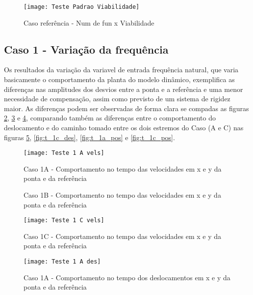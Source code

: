 \begin{figure}[H]
    \begin{center}
    \caption{Caso referência - Num de fun x Viabilidade}
    \texttt{[image: Teste Padrao Viabilidade]}
    \label{fig:t_padr_viab}
    \end{center}
\end{figure}

\subsection{Caso 1 - Variação da frequência}
Os resultados da variação da variavel de entrada frequência natural, que varia basicamente o comportamento da planta do
modelo dinâmico, exemplifica as diferenças nas amplitudes dos desvios entre a ponta e a referência e uma menor necessidade de compensação, assim como previsto
de um sistema de rigidez maior.
As diferenças podem ser observadas de forma clara se compadas as figuras \ref{fig:t_1a_vels}, \ref{fig:t_1b_vels} e \ref{fig:t_1c_vels},
comparando também as diferenças entre o comportamento do deslocamento e do caminho tomado entre os dois estremos do Caso (A e C) nas figuras
\ref{fig:t_1a_des}, \ref{fig:t_1c_des}, \ref{fig:t_1a_pos} e \ref{fig:t_1c_pos}.

\begin{figure}[H]
    \begin{center}
    \caption{Caso 1A - Comportamento no tempo das velocidades em x e y da ponta e da referência}
    \texttt{[image: Teste 1 A vels]}
    \label{fig:t_1a_vels}
    \end{center}
\end{figure}

\begin{figure}[H]
    \begin{center}
    \caption{Caso 1B - Comportamento no tempo das velocidades em x e y da ponta e da referência}
    \label{fig:t_1b_vels}
    \end{center}
\end{figure}

\begin{figure}[H]
    \begin{center}
    \caption{Caso 1C - Comportamento no tempo das velocidades em x e y da ponta e da referência}
    \texttt{[image: Teste 1 C vels]}
    \label{fig:t_1c_vels}
    \end{center}
\end{figure}

\begin{figure}[H]
    \begin{center}
    \caption{Caso 1A - Comportamento no tempo dos deslocamentos em x e y da ponta e da referência}
    \texttt{[image: Teste 1 A des]}
    \label{fig:t_1a_des}
    \end{center}
\end{figure}

